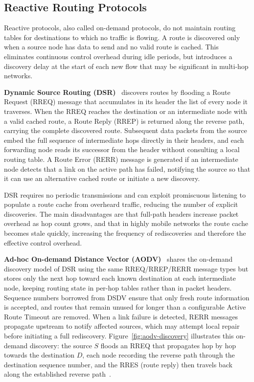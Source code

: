 \subsection{Reactive Routing Protocols}

Reactive protocols, also called on-demand protocols, do not maintain routing tables for
destinations to which no traffic is flowing. A route is discovered only when a source node has
data to send and no valid route is cached. This eliminates continuous control overhead during
idle periods, but introduces a discovery delay at the start of each new flow that may be
significant in multi-hop networks.

\textbf{Dynamic Source Routing (DSR)}~\cite{johnson1996dynamic} discovers routes by flooding a
Route Request (RREQ) message that accumulates in its header the list of every node it traverses. When the RREQ
reaches the destination or an intermediate node with a valid cached route, a Route Reply
(RREP) is returned along the reverse path, carrying the complete discovered route. Subsequent
data packets from the source embed the full sequence of intermediate hops directly in their
headers, and each forwarding node reads its successor from the header without consulting a local
routing table. A Route Error (RERR) message is generated if an intermediate node detects that
a link on the active path has failed, notifying the source so that it can use an alternative
cached route or initiate a new discovery.

DSR requires no periodic transmissions and can exploit promiscuous listening to populate a
route cache from overheard traffic, reducing the number of explicit discoveries. The main
disadvantages are that full-path headers increase packet overhead as hop count grows, and that
in highly mobile networks the route cache becomes stale quickly, increasing the frequency of
rediscoveries and therefore the effective control overhead.

\textbf{Ad-hoc On-demand Distance Vector (AODV)}~\cite{perkins1999adhoc} shares the on-demand
discovery model of DSR
using the same RREQ/RREP/RERR message types but stores only the next hop toward each
known destination at each intermediate node, keeping routing state in per-hop tables rather
than in packet headers. Sequence numbers borrowed from DSDV ensure that only fresh route
information is accepted, and routes that remain unused for longer than a configurable Active
Route Timeout are removed. When a link failure is detected, RERR messages propagate
upstream to notify affected sources, which may attempt local repair before initiating a full
rediscovery. Figure~\ref{fig:aodv-discovery} illustrates this on-demand discovery: the source
$S$ floods an RREQ that propagates hop by hop towards the destination $D$, each node recording
the reverse path through the destination sequence number, and the RRES (route reply) then
travels back along the established reverse path~\cite{bhatia2022networked}.

